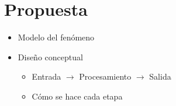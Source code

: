 \chapter{Propuesta}\label{chapter:proposal}

\begin{itemize}

\item Modelo del fenómeno
\item Diseño conceptual
\begin{itemize}

\item Entrada $\rightarrow$ Procesamiento $\rightarrow$ Salida
\item Cómo se hace cada etapa

\end{itemize}

\end{itemize}